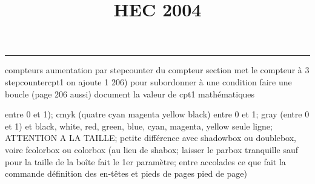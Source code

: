 \documentclass[11pt]{article}%
\title{\bf \vspace{-1cm} HEC 2004} %
\author{} %
\date{} %
\renewcommand{\headrulewidth}{0pt}%
\renewcommand{\footrulewidth}{0.4pt}%
\begin{document}
\maketitle %
\vspace{-1.2cm}\hrule %
\thispagestyle{fancy}

\vspace*{.4cm}


compteurs%
aumentation par stepcounter du compteur section%
met le compteur à 3%
stepcounter{cpt1} on ajoute 1%
206) pour subordonner à une condition %
faire une boucle (page 206 aussi) %
document la valeur de cpt1 
mathématiques\newcommand{\ch}{\operatorname{ch}} 
\newcommand{\sh}{\operatorname{sh}}
\renewcommand{\tanh}{\operatorname{th}}
\renewcommand{\sinh}{\operatorname{sh}}
\renewcommand{\cosh}{\operatorname{ch}}
\newcommand{\argsh}{\operatorname{argsh}}
\newcommand{\argch}{\operatorname{argch}}
\newcommand{\argth}{\operatorname{argth}}
\newcommand{\Id}{\operatorname{Id}}
\renewcommand{\leq}{\leq}
\renewcommand{\geq}{\geq }

\newcommand{\dlim}{\lim}
\newcommand{\dsum}{\sum}
\newcommand{\dprod}{\prod}



entre 0 et 1); cmyk (quatre cyan magenta yellow black) entre 0 et 1;
gray (entre 0 et 1) et black, white, red, green, blue, cyan, magenta,
yellow%
seule ligne; ATTENTION A LA TAILLE; petite différence avec shadowbox ou
doublebox, voire fcolorbox ou colorbox (au lieu de shabox; laisser le
parbox tranquille sauf pour la taille de la boîte
\newcommand{\Tbox}[1]{\begin{center} \shabox{\parbox{0.6
\linewidth}{#1}} \end{center}} %
fait le 1er paramètre; entre accolades ce que fait la commande
définition des en-têtes et pieds de pages\pagestyle{fancy}
\chead{}
\rfoot[ \ \thepage]{\thepage}
\cfoot{}
\lfoot{}
\thispagestyle{fancy} %
pied de page)\renewcommand{\footrulewidth}{0.4pt}
\renewcommand{\headrulewidth}{0.4pt}
\end{document}
